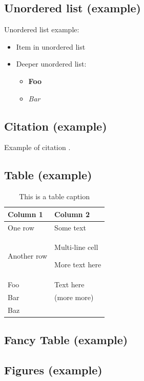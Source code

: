 \subsection{Unordered list (example)}

Unordered list example:
\begin{itemize}
\item Item in unordered list
\item Deeper unordered list:
  \begin{itemize}
  \item \textbf{Foo}
  \item \textit{Bar}
  \end{itemize}
\end{itemize}

\subsection{Citation (example)}

Example of citation \cite{urlSource}.

\newpage
\subsection{Table (example)}

\begin{table}[!h]
  \caption{This is a table caption}
  \centering
  \begin{tabular}{|L{5.1cm}|L{9.1cm}|}
    \hline
    \textbf{Column 1} & \textbf{Column 2}\\ \hline
    One row     & Some text\\ \hline
    Another row & Multi-line cell

                  More text here\\ \hline

    Foo & Text here\\ \hhline{-~}
    Bar & (more more)\\ \hhline{-~}
    Baz & \\ \hline
  \end{tabular}
\end{table}

\newpage
\subsection{Fancy Table (example)}


\subsection{Figures (example)}

